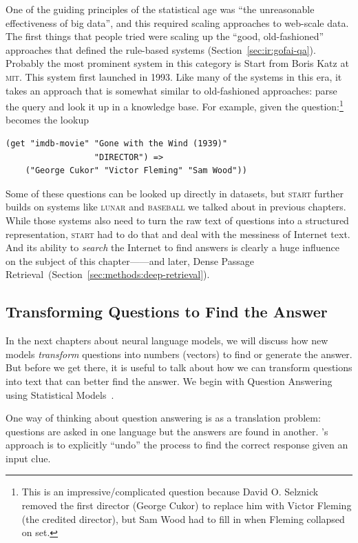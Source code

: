 One of the guiding principles of the statistical age was ``the
unreasonable effectiveness of big data'', and this required scaling 
approaches to web-scale data.
%
The first things that people tried were scaling up the ``good,
old-fashioned'' approaches that defined the rule-based systems (Section~\ref{sec:ir:gofai-qa}).
%
Probably the most prominent system in this category is Start from Boris Katz
at \textsc{mit}.  This system first launched in 1993.
%
Like many of the systems in
this era, it takes an approach that is somewhat similar to old-fashioned
 approaches: parse the query and look it up in a knowledge base.
%
For example, given the question:\footnote{This is an impressive/complicated question
    because David O. Selznick removed the first director (George Cukor) to
    replace him with Victor Fleming (the credited director), but Sam Wood had
    to fill in when Fleming collapsed on set.}
%
%
becomes the lookup~\citep{katz-02}
\begin{verbatim}
(get "imdb-movie" "Gone with the Wind (1939)"
                  "DIRECTOR") =>
    ("George Cukor" "Victor Fleming" "Sam Wood"))
\end{verbatim}
%
Some of these questions can be looked up directly in datasets, but
\textsc{start} further builds on systems like \textsc{lunar} and
\textsc{baseball} we talked about in previous chapters.
%
While those systems also need to turn the raw text of questions into a structured
representation, \textsc{start} had to do that and deal with the
messiness of Internet text.
%
And its ability to \emph{search} the
Internet to find answers is clearly a huge influence on the subject of this
chapter---\watson{}---and later, Dense Passage
Retrieval~(Section~\ref{sec:methods:deep-retrieval}).

\subsection{Transforming Questions to Find the Answer}
In the next chapters about neural language models, we will discuss how new
models \emph{transform} questions into numbers (vectors) to find or generate
the answer.
%
But before we get there, it is useful to talk about how we can transform
questions into text that can better find the answer.
%
We begin with Question Answering using Statistical
Models~\citep[]{radev-01}.

One way of thinking about question answering is as a translation
problem: questions are asked in one language but the answers are found in
another.
%
's approach is to explicitly ``undo'' the process to find the
correct response given an input clue.

